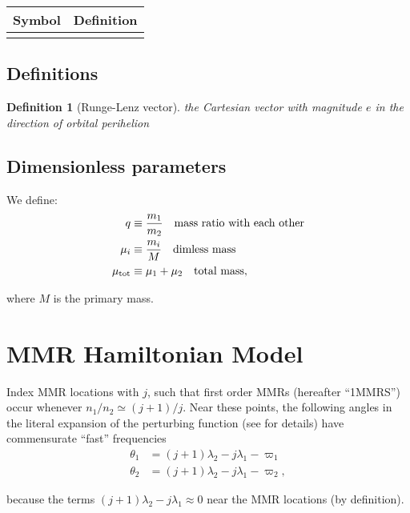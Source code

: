 \documentclass[11pt]{article}
\newtheorem{defn}{Definition}
\begin{document}
\begin{center}
\begin{tabular}{ll}
\hline
Symbol & Definition\\
\hline
 & \\
\hline
\end{tabular}
\end{center}

\subsection{Definitions}
\label{sec:orga6b9b83}
\begin{defn}[Runge-Lenz vector]
the Cartesian vector with magnitude $e$ in the
direction of orbital perihelion
\end{defn}

\subsection{Dimensionless parameters}
\label{sec:orgca4e7d0}
We define:
\begin{align}
 q&\equiv \frac{m_1}{m_2}\quad\text{mass ratio with each other}\\ 
 \mu_i&\equiv \frac{m_i}{M}\quad\text{dimless mass}\\ 
 \mu_{\rm tot}&\equiv \mu_1+\mu_2\quad\text{total mass},\\ 
\end{align}

\noindent
where \(M\) is the primary mass.

\section{MMR Hamiltonian Model}
\label{sec:org22371e7}
Index MMR locations with \(j\), such that first order MMRs (hereafter ``1MMRS'') occur whenever
\(n_1/n_2\simeq(j+1)/j\).
Near these points, the following angles in the literal expansion of the perturbing
function (see \cite{murray_solar_2000} for details) have commensurate ``fast'' frequencies
\begin{align}
\theta_1 &= (j+1)\lambda_2-j\lambda_1-\varpi_1\\
\theta_2 &= (j+1)\lambda_2-j\lambda_1-\varpi_2,
\end{align}

\noindent
because the terms \((j+1)\lambda_2-j\lambda_1\approx 0\) near the MMR locations (by definition).
\end{document}
